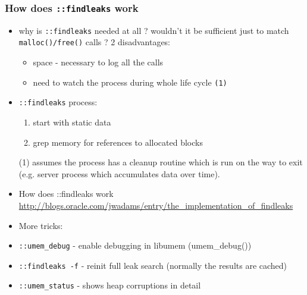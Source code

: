 \subsubsection{How does \texttt{::findleaks} work}

\begin{itemize}
  \item why is \texttt{::findleaks} needed at all ? wouldn't it be sufficient
     just to match \texttt{malloc()/free()} calls ? 2 disadvantages:
     \begin{itemize}
     \item space - necessary to log all the calls
     \item need to watch the process during whole life cycle \texttt{(1)}
     \end{itemize}
  \item \texttt{::findleaks} process:
  \begin{enumerate}
    \item start with static data
    \item grep memory for references to allocated blocks
  \end{enumerate}
\end{itemize}

\begin{itemize}
  \item[(1)] assumes the process has a cleanup routine which is run on the way
       to exit (e.g. server process which accumulates data over time).
\end{itemize}

\begin{itemize}
\item How does ::findleaks work
  \url{http://blogs.oracle.com/jwadams/entry/the\_implementation\_of\_findleaks}
\end{itemize}

\begin{itemize}
\item More tricks:
  \item \texttt{::umem\_debug}
    - enable debugging in libumem (umem\_debug())
  \item \texttt{::findleaks -f}
    - reinit full leak search (normally the results are cached)
  \item \texttt{::umem\_status}
    - shows heap corruptions in detail
\end{itemize}

